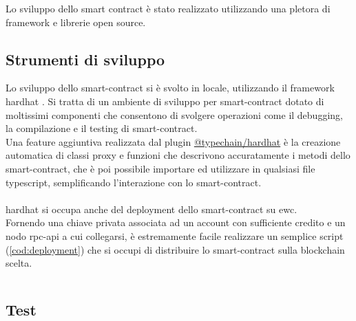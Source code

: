 Lo sviluppo dello smart contract è stato realizzato utilizzando una pletora di framework e librerie open source.

\subsection{Strumenti di sviluppo}

Lo sviluppo dello \gls{smart-contract} si è svolto in locale, utilizzando il framework hardhat \cite{sftw:hardhat}.
Si tratta di un ambiente di sviluppo per \gls{smart-contract} dotato di moltissimi componenti
che consentono di svolgere operazioni come il debugging, la compilazione e il testing di \gls{smart-contract}. \\
Una feature aggiuntiva realizzata dal plugin \href{https://www.npmjs.com/package/@typechain/hardhat}{@typechain/hardhat} \cite{sftw:typechain_hardhat} è la creazione automatica di
classi proxy e funzioni che descrivono accuratamente i metodi dello \gls{smart-contract},
che è poi possibile importare ed utilizzare in qualsiasi file typescript, semplificando l'interazione con lo \gls{smart-contract}. \\
\\
hardhat si occupa anche del deployment dello \gls{smart-contract} su \gls{ewc}. \\
Fornendo una chiave privata associata ad un account con sufficiente credito e un nodo \gls{rpc-api} a cui collegarsi,
è estremamente facile realizzare un semplice script (\autoref{cod:deployment}) che si occupi di distribuire lo \gls{smart-contract} sulla blockchain scelta.

\inputminted{typescript}{../contracts/scripts/deployAggregatorContract.ts}

\subsection{Test}

